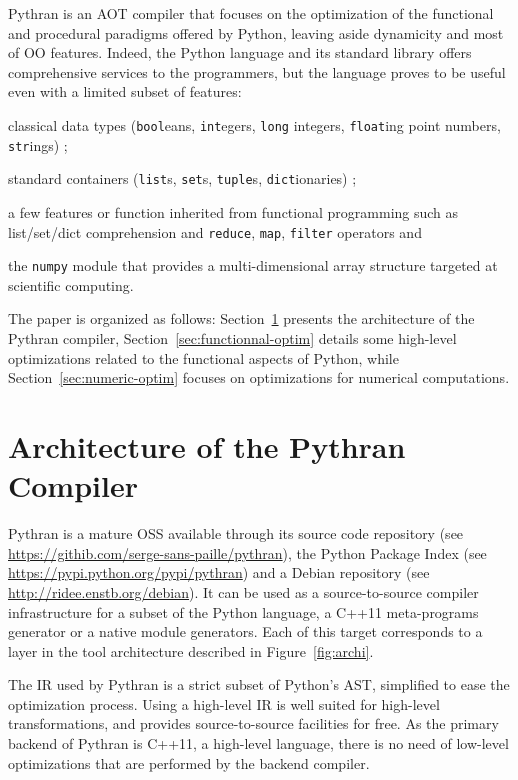 \documentclass{llncs}
\begin{document}
Pythran\cite{pythran2013} is an \ac{AOT} compiler that focuses on the
optimization of the functional and procedural paradigms offered by Python,
leaving aside dynamicity and most of \ac{OO} features.  Indeed, the Python
language and its standard library offers comprehensive services to the
programmers, but the language proves to be useful even with a limited subset of
features:
\begin{inparaenum}[1)]
\item classical data types (\texttt{bool}eans, \texttt{int}egers,
\texttt{long} integers, \texttt{float}ing point numbers, \texttt{str}ings) ;
\item standard containers (\texttt{list}s, \texttt{set}s, \texttt{tuple}s,
\texttt{dict}ionaries) ;
\item a few features or function inherited from
functional programming such as list/set/dict comprehension and \texttt{reduce},
\texttt{map}, \texttt{filter} operators and
\item the \texttt{numpy} module that
provides a multi-dimensional array structure targeted at scientific computing. 
\end{inparaenum}

The paper is organized as follows: Section~\ref{sec:architecture} presents the
architecture of the Pythran compiler, Section~\ref{sec:functionnal-optim}
details some high-level optimizations related to the functional aspects of
Python, while Section~\ref{sec:numeric-optim} focuses on optimizations for
numerical computations.

\section{Architecture of the Pythran Compiler}
\label{sec:architecture}

Pythran is a mature \ac{OSS} available through its source code
repository (see \url{https://githib.com/serge-sans-paille/pythran}), the
Python Package Index (see \url{https://pypi.python.org/pypi/pythran}) and
a Debian repository (see \url{http://ridee.enstb.org/debian}). It can be
used as a source-to-source compiler infrastructure for a subset of the Python
language, a C++11 meta-programs generator or a native module generators. Each
of this target corresponds to a layer in the tool architecture described in
Figure~\ref{fig:archi}.

The \ac{IR} used by Pythran is a strict subset of Python's \ac{AST}, simplified
to ease the optimization process. Using a high-level \ac{IR} is well suited for
high-level transformations, and provides source-to-source facilities for free.
As the primary backend of Pythran is C++11, a high-level language, there is no
need of low-level optimizations that are performed by the backend compiler.
\end{document}
